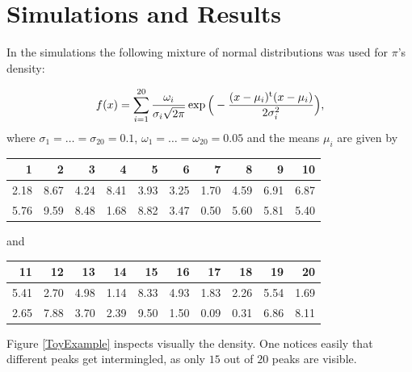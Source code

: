 \chapter{ Simulations and Results }\label{simulationsAndResults}

In the simulations the following mixture of normal distributions was used for $\pi$'s density:

\begin{equation}\label{experimental pi}
f(x) = 
\sum_{i=1}^{20} \frac{\omega_i}{ \sigma_i \sqrt{2 \pi} } \exp \Big( -\frac{(x - \mu_i)^{\mathrm{t}} (x - \mu_i)}{2 \sigma_i^2} \Big),	
\end{equation}
where $\sigma_1 = \dots = \sigma_{20} = 0.1$, $\omega_1 = \dots = \omega_{20} = 0.05 $ and the means $\mu_i$ are given by

\begin{table}[ht]
	\centering
\begin{tabular}{rrrrrrrrrr}
  \hline
1 & 2 & 3 & 4 & 5 & 6 & 7 & 8 & 9 & 10 \\ 
  \hline
2.18 & 8.67 & 4.24 & 8.41 & 3.93 & 3.25 & 1.70 & 4.59 & 6.91 & 6.87 \\ 
  5.76 & 9.59 & 8.48 & 1.68 & 8.82 & 3.47 & 0.50 & 5.60 & 5.81 & 5.40 \\ 
   \hline
\end{tabular}
\end{table}
and 

\begin{table}[ht]
	\centering
\begin{tabular}{rrrrrrrrrr}
  \hline
11 & 12 & 13 & 14 & 15 & 16 & 17 & 18 & 19 & 20 \\ 
  \hline
5.41 & 2.70 & 4.98 & 1.14 & 8.33 & 4.93 & 1.83 & 2.26 & 5.54 & 1.69 \\ 
  2.65 & 7.88 & 3.70 & 2.39 & 9.50 & 1.50 & 0.09 & 0.31 & 6.86 & 8.11 \\ 
   \hline
\end{tabular}
\end{table}
 
Figure \ref{ToyExample} inspects visually the density. One notices easily that different peaks get intermingled, as only $15$ out of $20$ peaks are visible.  

